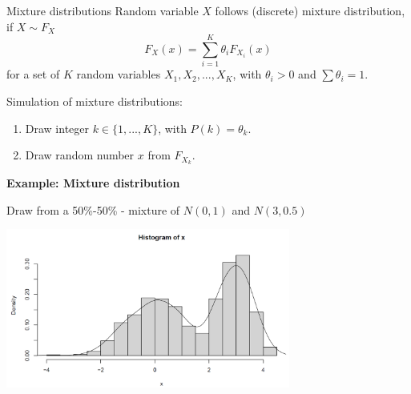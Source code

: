 \begin{vbframe}{Mixture distributions}
Random variable $X$ follows (discrete) mixture distribution, if $X \sim F_X$
$$
F_X(x) = \sum_{i=1}^K \theta_i F_{X_i}(x)
$$
for a set of $K$ random variables $X_1, X_2, ..., X_K$, with $\theta_i >0$ and $\sum\theta_i=1$.

\lz

Simulation of mixture distributions:
\begin{enumerate}
\item Draw integer $k \in \{1,...,K\}$, with $P(k)=\theta_k$.
\item Draw random number $x$ from $F_{X_k}$.
\end{enumerate}

\framebreak

\textbf{Example: Mixture distribution}

\lz

Draw from a 50\%-50\% - mixture of $N(0,1)$ and $N(3,0.5)$


\begin{center}
\includegraphics[width =0.7\textwidth]{figure_man/mixdist.png}
\end{center}



\end{vbframe}

